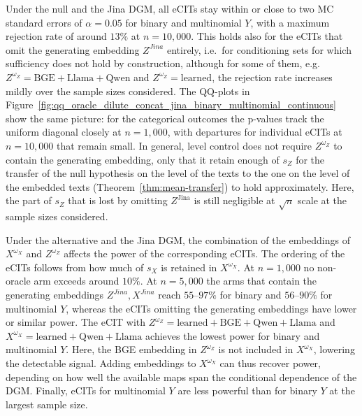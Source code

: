 \documentclass[twoside,11pt]{article}
\begin{document}
Under the null and the Jina DGM, all eCITs stay within or close to two MC standard errors of $\alpha = 0.05$ for binary and multinomial $Y$, with a maximum rejection rate of around $13\%$ at $n = 10{,}000$.  %
This holds also for the eCITs that omit the generating embedding $Z^{Jina}$ entirely, i.e.\ for conditioning sets for which sufficiency does not hold by construction, although for some of them, e.g.\ $Z^{\omega_Z} =\text{BGE}+\text{Llama}+\text{Qwen}$ and $Z^{\omega_Z} = \text{learned}$, the rejection rate increases mildly over the sample sizes considered.
The QQ-plots in Figure~\ref{fig:qq_oracle_dilute_concat_jina_binary_multinomial_continuous} show the same picture: for the categorical outcomes the p-values track the uniform diagonal closely at $n = 1{,}000$, with departures for individual eCITs at $n = 10{,}000$ that remain small.
In general, level control does not require $Z^{\omega_Z}$ to contain the generating embedding, only that it retain enough of $s_Z$ for the transfer of the null hypothesis on the level of the texts to the one on the level of the embedded texts (Theorem~\ref{thm:mean-transfer}) to hold approximately. Here, the part of $s_Z$ that is lost by omitting $Z^{\text{Jina}}$ is still negligible at $\sqrt{n}$ scale at the sample sizes considered.

Under the alternative and the Jina DGM, the combination of the embeddings of $X^{\omega_X}$ and $Z^{\omega_Z}$ affects the power of the corresponding eCITs. 
The ordering of the eCITs follows from how much of $s_X$ is retained in $X^{\omega_X}$.
At $n = 1{,}000$ no non-oracle arm exceeds around $10\%$. At $n = 5{,}000$ the arms that contain the generating embeddings $Z^{Jina}, X^{Jina}$ reach $55$--$97\%$ for binary and $56$--$90\%$ for multinomial $Y$, whereas the eCITs omitting the generating embeddings have lower or similar power. 
The eCIT with $Z^{\omega_Z} = \text{learned}+\text{BGE}+\text{Qwen}+\text{Llama}$ and $X^{\omega_X} = \text{learned}+\text{Qwen}+\text{Llama}$ achieves the lowest power for binary and multinomial $Y$. Here, the BGE embedding in $Z^{\omega_Z}$ is not included in $X^{\omega_X}$, lowering the detectable signal.
Adding embeddings to $X^{\omega_X}$  can thus recover power, depending on how well the available maps span the conditional dependence of the DGM.
Finally, eCITs for multinomial $Y$ are less powerful than for binary $Y$ at the largest sample size. 
\end{document}
